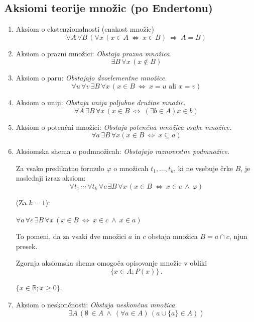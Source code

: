 \documentclass[11pt,paper=b5,DIV=13,headinclude,footinclude]{scrbook}
\newcounter{example}
\def\inn {{~\wedge~}}
\def\sledi {{~\Rightarrow~}}
\def\cee {{~\Leftrightarrow~}}
\begin{document}
\subsection{Aksiomi teorije množic (po Endertonu)}

\begin{enumerate}
  \item Aksiom o ekstenzionalnosti (enakost množic)
  $$\forall A\, \forall B\, (\forall x \,(x\in A \cee x\in B) \sledi A = B)$$

  \item Aksiom o prazni množici:
  \emph{ Obstaja prazna množica.}
  $$\exists B\, \forall x\, (x\not \in B)$$

  \item Aksiom o paru: \emph{ Obstajajo dvoelementne množice.}
    $$\forall u\, \forall v\, \exists B\, \forall x\, (x\in B \cee x = u\textrm{ ali }x = v)$$

  \item Aksiom o uniji: \emph{ Obstaja unija poljubne družine množic.}
    $$\forall A\, \exists B\, \forall x\, (x\in B \cee (\exists b\in A) x\in b)$$

  \item Aksiom o potenčni množici: \emph{ Obstaja potenčna množica vsake množice.}
    $$\forall a\, \exists B\, \forall x (x\in B \cee x\subseteq a)$$

  \item Aksiomska shema o podmnožicah: \emph{ Obstajajo raznovrstne podmnožice.}

  Za vsako predikatno formulo $\varphi$ o množicah $t_1,\ldots, t_k$, ki ne vsebuje črke $B$, je naslednji izraz aksiom:
$$\forall t_1\,\cdots\, \forall t_k\,\forall c\,\exists B \,\forall x \,(x\in B \cee x\in c \inn \varphi)$$

\begin{example*}
(Za $k = 1$):

$\forall a \,\forall c \,\exists B \, \forall x\, (x\in B \cee x\in c \inn x\in a)$

To pomeni, da za vsaki dve množici $a$ in $c$ obstaja množica $B = a\cap c$, njun presek.
\end{example*}
\medskip
Zgornja aksiomska shema omogoča opisovanje množic v obliki
$$\{x\in A; P(x)\}\,.$$

\begin{example*}
$\{x\in \mathbb{R}; x\ge 0\}$.
\end{example*}

  \item Aksiom o neskončnosti: \emph{ Obstaja neskončna množica.}
$$\exists A\,(\emptyset \,\in A \inn (\forall a\in A)\, (a\cup \{a\}\in A))$$


\end{enumerate}
\end{document}
